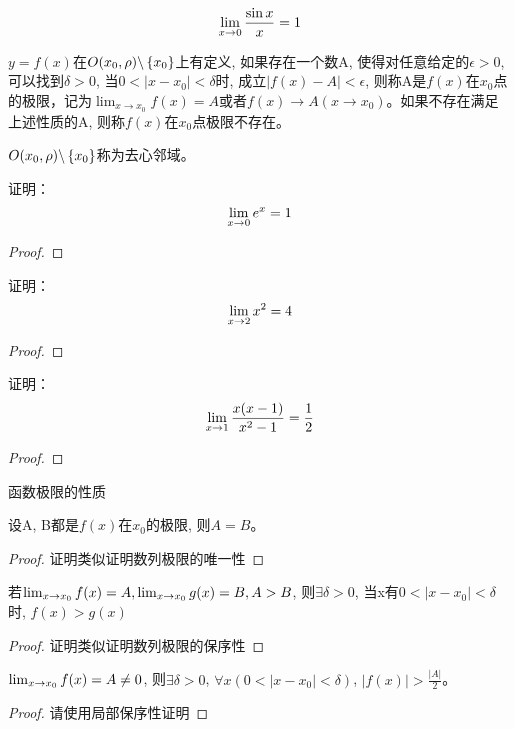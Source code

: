 \documentclass[lang=cn]{elegantbook}
\begin{document}
\[ \lim_{x \to 0 } \frac{\sin x}{x} = 1 \]
\begin{definition}
    $y = f(x)$在$O(x_0, \rho) \backslash \left\{ x_0\right\}$上有定义, 如果存在一个数A, 使得对任意给定的$\epsilon > 0$, 可以找到$\delta > 0$, 当$0 < \left| x - x_0 \right| < \delta$时, 成立$\left| f(x) - A\right| < \epsilon$, 则称A是$f(x)$在$x_0$点的极限，记为$\lim_{x \to x_0} f(x) = A$或者$f(x) \to A (x \to x_0)$。如果不存在满足上述性质的A, 则称$f(x)$在$x_0$点极限不存在。
\end{definition}
$O(x_0, \rho) \backslash \left\{ x_0\right\}$称为去心邻域。

\begin{proposition}
    证明：
    \[ \lim_{x \to 0 } e^x = 1\]
\end{proposition}
\begin{proof}

\end{proof}

\begin{proposition}
    证明：
    \[ \lim_{x \to 2 } x^2 = 4 \]
\end{proposition}
\begin{proof}

\end{proof}

\begin{proposition}
    证明：
    \[ \lim_{x \to 1 } \frac{x(x-1)}{x^2-1} = \frac{1}{2} \]
\end{proposition}
\begin{proof}
    
\end{proof}

函数极限的性质
\begin{theorem}[函数极限的唯一性]
    设A, B都是$f(x)$在$x_0$的极限, 则$A=B$。 
\end{theorem}
\begin{proof}
    证明类似证明数列极限的唯一性
\end{proof}

\begin{theorem}[函数极限的局部保序性]
    若$\lim_{x \to x_0 } f(x) = A, \lim_{x \to x_0 } g(x) = B, A > B$, 则$\exists \delta > 0$, 当x有$0 < \left| x - x_0 \right| < \delta $时, $f(x) > g(x)$  
\end{theorem}
\begin{proof}
    证明类似证明数列极限的保序性
\end{proof}

\begin{lemma}
    $\lim_{x \to x_0 } f(x) = A \neq 0$, 则$\exists \delta > 0$, $\forall x ( 0 < \left| x - x_0\right| < \delta)$, $\left| f(x) \right| > \frac{\left| A \right|}{2}$。
\end{lemma}
\begin{proof}
    请使用局部保序性证明
\end{proof}
\end{document}
